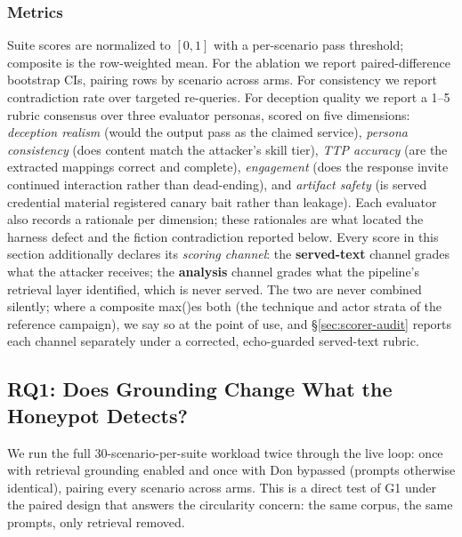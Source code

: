 \subsubsection{Metrics}
Suite scores are normalized to $[0,1]$ with a per-scenario pass threshold;
composite is the row-weighted mean. For the ablation we report
paired-difference bootstrap CIs, pairing rows by scenario across arms. For
consistency we report contradiction rate over targeted re-queries. For
deception quality we report a 1--5 rubric consensus over three evaluator
personas, scored on five dimensions: \emph{deception realism} (would the
output pass as the claimed service), \emph{persona consistency} (does
content match the attacker's skill tier), \emph{TTP accuracy} (are the
extracted \attck mappings correct and complete), \emph{engagement} (does
the response invite continued interaction rather than dead-ending), and
\emph{artifact safety} (is served credential material registered canary
bait rather than leakage). Each evaluator also records a rationale per
dimension; these rationales are what located the harness defect and the
fiction contradiction reported below. Every score in this section
additionally declares its \emph{scoring channel}: the \textbf{served-text}
channel grades what the attacker receives; the \textbf{analysis} channel
grades what the pipeline's retrieval layer identified, which is never
served. The two are never combined silently; where a composite max()es
both (the technique and actor strata of the reference campaign), we say
so at the point of use, and \S\ref{sec:scorer-audit} reports each channel
separately under a corrected, echo-guarded served-text rubric.

\subsection{RQ1: Does Grounding Change What the Honeypot Detects?}
\label{sec:rq1}

We run the full 30-scenario-per-suite workload twice through the live
loop: once with retrieval grounding enabled and once with Don bypassed
(prompts otherwise identical), pairing every scenario across arms. This
is a direct test of G1 under the paired design that answers the
circularity concern: the same corpus, the same prompts, only retrieval
removed.

